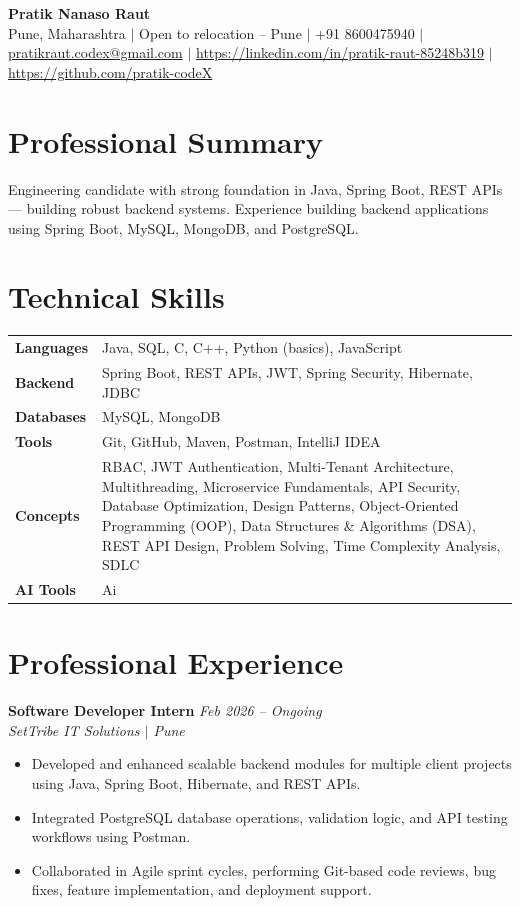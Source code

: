 \documentclass[10.5pt,a4paper]{article}
\begin{document}
\begin{center}
{\Large\bfseries Pratik Nanaso Raut}\\[2pt]
Pune, Maharashtra $|$ Open to relocation -- Pune $|$ +91 8600475940 $|$ \href{mailto:pratikraut.codex@gmail.com}{pratikraut.codex@gmail.com} $|$ \href{https://linkedin.com/in/pratik-raut-85248b319}{https://linkedin.com/in/pratik-raut-85248b319} $|$ \href{https://github.com/pratik-codeX}{https://github.com/pratik-codeX}
\end{center}
\vspace{-2pt}
\section{Professional Summary}
Engineering candidate with strong foundation in Java, Spring Boot, REST APIs — building robust backend systems. Experience building backend applications using Spring Boot, MySQL, MongoDB, and PostgreSQL.
\section{Technical Skills}
\begin{tabular}{@{}p{}p{}@{}}
\textbf{Languages} & Java, SQL, C, C++, Python (basics), JavaScript \\[1pt]
\textbf{Backend} & Spring Boot, REST APIs, JWT, Spring Security, Hibernate, JDBC \\[1pt]
\textbf{Databases} & MySQL, MongoDB \\[1pt]
\textbf{Tools} & Git, GitHub, Maven, Postman, IntelliJ IDEA \\[1pt]
\textbf{Concepts} & RBAC, JWT Authentication, Multi-Tenant Architecture, Multithreading, Microservice Fundamentals, API Security, Database Optimization, Design Patterns, Object-Oriented Programming (OOP), Data Structures \& Algorithms (DSA), REST API Design, Problem Solving, Time Complexity Analysis, SDLC \\[1pt]
\textbf{AI Tools} & Ai \\
\end{tabular}
\section{Professional Experience}
\textbf{Software Developer Intern} \hfill \textit{Feb 2026 -- Ongoing}
\\\textit{SetTribe IT Solutions $|$ Pune}
\begin{itemize}
  \item Developed and enhanced scalable backend modules for multiple client projects using Java, Spring Boot, Hibernate, and REST APIs.
  \item Integrated PostgreSQL database operations, validation logic, and API testing workflows using Postman.
  \item Collaborated in Agile sprint cycles, performing Git-based code reviews, bug fixes, feature implementation, and deployment support.
\end{itemize}
\end{document}
